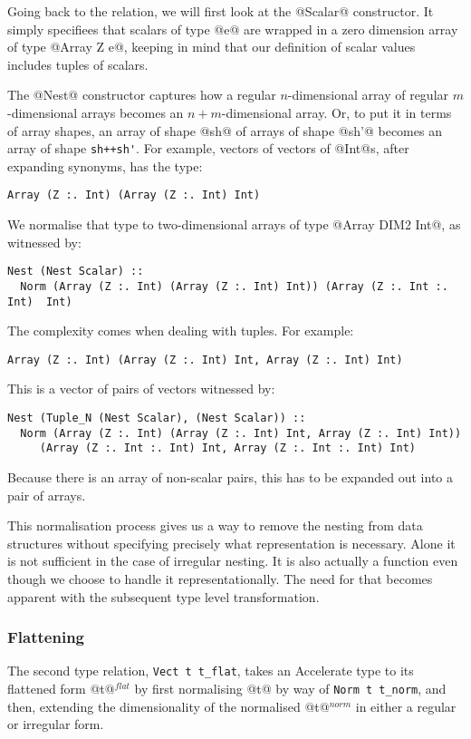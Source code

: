 Going back to the relation, we will first look at the @Scalar@ constructor. It simply specifiees that scalars of type @e@ are wrapped in a zero dimension array of type @Array Z e@, keeping in mind that our definition of scalar values includes tuples of scalars.

The @Nest@ constructor captures how a regular $n$-dimensional array of regular $m$-dimensional arrays becomes an $n+m$-dimensional array. Or, to put it in terms of array shapes, an array of shape @sh@ of arrays of shape @sh'@ becomes an array of shape \lstinline[style=ndp]{sh++sh'}.
For example, vectors of vectors of @Int@s, after expanding synonyms, has the type:
%
\begin{lstlisting}[style=ndp]
Array (Z :. Int) (Array (Z :. Int) Int)
\end{lstlisting}
%
We normalise that type to two-dimensional arrays of type @Array DIM2 Int@, as witnessed by:
%
\begin{lstlisting}[style=ndp]
Nest (Nest Scalar) ::
  Norm (Array (Z :. Int) (Array (Z :. Int) Int)) (Array (Z :. Int :. Int)  Int)
\end{lstlisting}
%
The complexity comes when dealing with tuples. For example:
%
\begin{lstlisting}[style=ndp]
Array (Z :. Int) (Array (Z :. Int) Int, Array (Z :. Int) Int)
\end{lstlisting}
%
This is a vector of pairs of vectors witnessed by:
%
\begin{lstlisting}[style=ndp]
Nest (Tuple_N (Nest Scalar), (Nest Scalar)) ::
  Norm (Array (Z :. Int) (Array (Z :. Int) Int, Array (Z :. Int) Int))
     (Array (Z :. Int :. Int) Int, Array (Z :. Int :. Int) Int)
\end{lstlisting}
%
Because there is an array of non-scalar pairs, this has to be expanded out into a pair of arrays.

This normalisation process gives us a way to remove the nesting from data structures without specifying precisely what representation is necessary. Alone it is not sufficient in the case of irregular nesting. It is also actually a function even though we choose to handle it representationally. The need for that becomes apparent with the subsequent type level transformation.

\subsubsection{Flattening}
The second type relation, \lstinline[style=ndp]{Vect t t_flat}, takes an Accelerate type to its flattened form @t@$^{\textit{flat}}$ by first normalising @t@ by way of \lstinline[style=ndp]{Norm t t_norm}, and then, extending the dimensionality of the normalised @t@$^{\textit{norm}}$ in either a regular or irregular form.

